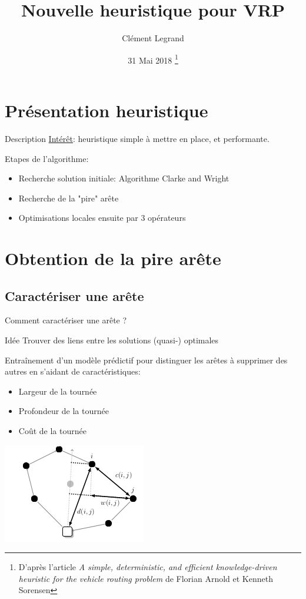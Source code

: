 \documentclass{beamer}
\title{Nouvelle heuristique pour VRP}
\author{Clément Legrand}
\date{31 Mai 2018 \footnote{D'après l'article \emph{A simple, deterministic, and efficient knowledge-driven heuristic
for the vehicle routing problem} de Florian Arnold et Kenneth Sorensen}}
\begin{document}
\section{Présentation heuristique}

\begin{frame}[plain]
\titlepage
\end{frame}

\begin{frame}{Description}
\underline{Intérêt}: heuristique simple à mettre en place, et performante.

\begin{block}{Etapes de l'algorithme:}
\begin{itemize}
\item Recherche solution initiale: Algorithme Clarke and Wright

\item Recherche de la "pire" arête

\item Optimisations locales ensuite par 3 opérateurs
\end{itemize}
\end{block}

\end{frame}

\section{Obtention de la pire arête}

\subsection{Caractériser une arête}

\begin{frame}{Comment caractériser une arête ?}
\begin{block}{Idée}
Trouver des liens entre les solutions (quasi-) optimales
\end{block}

Entraînement d'un modèle prédictif pour distinguer
les arêtes à supprimer des autres en s'aidant de caractéristiques:
\begin{itemize}
\item Largeur de la tournée
\item Profondeur de la tournée
\item Coût de la tournée
\end{itemize}

	\centering
	\includegraphics[height=0.4\textheight]{metrics.png}
	
\end{frame}
\end{document}
